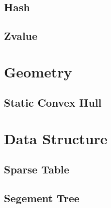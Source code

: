 \subsection{Hash} 

\subsection{Zvalue} 


\section{Geometry}
\subsection{Static Convex Hull} 


\section{Data Structure}
\subsection{Sparse Table}

\subsection{Segement Tree}

